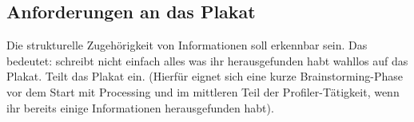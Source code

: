 \documentclass[loesung]{schulein}
\begin{document}
%
\begin{aufgabenbox}{}{}
\vspace*{-1em}
\subsection*{Anforderungen an das Plakat}
Die strukturelle Zugehörigkeit von Informationen soll erkennbar sein. Das bedeutet: schreibt nicht einfach alles was ihr herausgefunden habt wahllos auf das Plakat. Teilt das Plakat ein. (Hierfür eignet sich eine kurze Brainstorming-Phase vor dem Start mit Processing und im mittleren Teil der Profiler-Tätigkeit, wenn ihr bereits einige Informationen herausgefunden habt).
\end{aufgabenbox}
\end{document}
